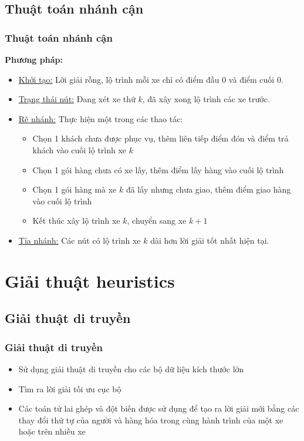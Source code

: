 \documentclass{beamer}
\begin{document}
	\subsection{Thuật toán nhánh cận}
	\begin{frame}
		\frametitle{Thuật toán nhánh cận}
		\textbf{Phương pháp:}
		\begin{itemize}
			\item \underline{Khởi tạo:} Lời giải rỗng, lộ trình mỗi xe chỉ có điểm đầu $0$ và điểm cuối $0$.
			\item \underline{Trạng thái nút:} Đang xét xe thứ $k$, đã xây xong lộ trình các xe trước.
			\item {
				\underline{Rẽ nhánh:} Thực hiện một trong các thao tác:
				\begin{itemize}
					\item Chọn 1 khách chưa được phục vụ, thêm liên tiếp điểm đón và điểm trả khách vào cuối lộ trình xe $k$
					\item Chọn 1 gói hàng chưa có xe lấy, thêm điểm lấy hàng vào cuối lộ trình
					\item Chọn 1 gói hàng mà xe $k$ đã lấy nhưng chưa giao, thêm điểm giao hàng vào cuối lộ trình
					\item Kết thúc xây lộ trình xe $k$, chuyển sang xe $k+1$
				\end{itemize}
			}
			\item \underline{Tỉa nhánh:} Các nút có lộ trình xe $k$ dài hơn lời giải tốt nhất hiện tại.
		\end{itemize}
	\end{frame}
	
	
	\section{Giải thuật heuristics}
	
	
	\subsection{Giải thuật di truyền}
	
	\begin{frame}
		\frametitle{Giải thuật di truyền}
		\begin{itemize}
			\item Sử dụng giải thuật di truyền cho các bộ dữ liệu kích thước lớn
			\item Tìm ra lời giải tối ưu cục bộ
			\item Các toán tử lai ghép và đột biến được sử dụng để tạo ra lời giải mới bằng các thay đổi thứ tự của người và hàng hóa trong cùng hành trình của một xe hoặc trên nhiều xe
		\end{itemize}
	\end{frame}
	
\end{document}
